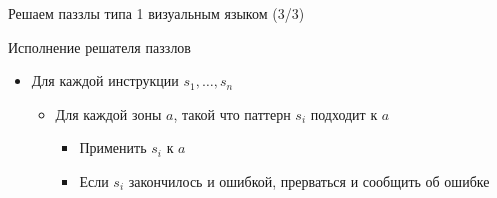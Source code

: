 \documentclass[aspectratio=169
  , xcolor={svgnames}
  , hyperref={ colorlinks,citecolor=DeepPink4
             , linkcolor=DarkRed,urlcolor=DarkBlue}
  , russian
  ]{beamer}
\theoremstyle{exerciseStyle1}
\begin{document}
\begin{frame}[fragile]{Решаем паззлы типа 1 визуальным языком (3/3)}
\begin{minipage}{.48\textwidth}
Исполнение решателя паззлов
\begin{itemize}
\item Для каждой инструкции $s_1, \dots, s_n$
\begin{itemize}
\item Для каждой зоны $a$, такой что паттерн $s_i$ подходит к $a$
\begin{itemize}
\item Применить $s_i$ к $a$
\item Если $s_i$ закончилось и ошибкой, прерваться и сообщить об ошибке
\end{itemize}
\end{itemize}
\end{itemize}
\end{minipage}
\end{frame}
\end{document}
